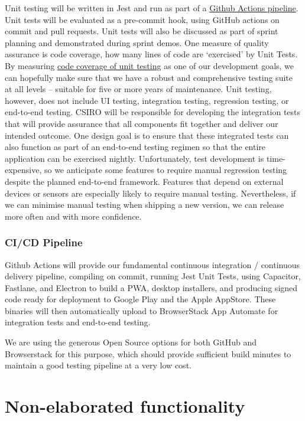 \documentclass{faims3_report}
\begin{document}
Unit testing will be written in Jest and run as part of a
\href{https://github.com/FAIMS/FAIMS3-Elaboration/blob/master/.github/workflows/node.js.yml}{{Github
Actions pipeline}}. Unit tests will be evaluated as a pre-commit hook,
using GitHub actions on commit and pull requests. Unit tests will also
be discussed as part of sprint planning and demonstrated during sprint
demos. One measure of quality assurance is code coverage, how many lines
of code are `exercised' by Unit Tests. By measuring
\href{https://jestjs.io/docs/en/cli.html\#--coverageboolean}{{code
coverage of unit testing}} as one of our development goals, we can
hopefully make sure that we have a robust and comprehensive testing
suite at all levels -- suitable for five or more years of maintenance.
Unit testing, however, does not include UI testing, integration testing,
regression testing, or end-to-end testing. CSIRO will be responsible for
developing the integration tests that will provide assurance that all
components fit together and deliver our intended outcome. One design
goal is to ensure that these integrated tests can also function as part
of an end-to-end testing regimen so that the entire application can be
exercised nightly. Unfortunately, test development is time-expensive, so
we anticipate some features to require manual regression testing despite
the planned end-to-end framework. Features that depend on external
devices or sensors are especially likely to require manual testing.
Nevertheless, if we can minimise manual testing when shipping a new
version, we can release more often and with more confidence.

\subsection{CI/CD Pipeline}

Github Actions will provide our fundamental continuous integration /
continuous delivery pipeline, compiling on commit, running Jest Unit
Tests, using Capacitor, Fastlane, and Electron to build a PWA, desktop
installers, and producing signed code ready for deployment to Google
Play and the Apple AppStore. These binaries will then automatically
upload to BrowserStack App Automate for integration tests and end-to-end
testing.

We are using the generous Open Source options for both GitHub and
Browserstack for this purpose, which should provide sufficient build
minutes to maintain a good testing pipeline at a very low cost.

\chapter{Non-elaborated
functionality}
\end{document}
